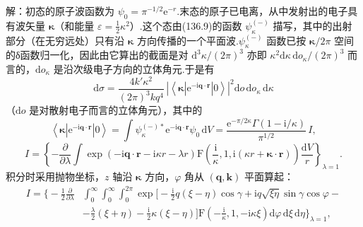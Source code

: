 解：初态的原子波函数为 $\psi_0=\pi^{-1/2}\mathrm{e}^{-r}$.末态的原子已电离，从中发射出的电子具有波矢量 $\boldsymbol{\kappa}$（和能量 $\varepsilon=\frac{1}{2}\kappa^2$）.这个态由(136.9)的函数 $\psi_{\kappa}^{(-)}$ 描写，其中的出射部分（在无穷远处）只有沿 $\boldsymbol{\kappa}$ 方向传播的一个平面波.$\psi_{\kappa}^{(-)}$ 函数已按 $\boldsymbol{\kappa}/2\pi$ 空间的δ函数归一化，因此由它算出的截面是对 $\mathrm{d}^3\kappa/(2\pi)^3$ 亦即 $\kappa^2\mathrm{d}\kappa\,\mathrm{d}o_{\kappa}/(2\pi)^3$ 而言的，$\mathrm{d}o_{\kappa}$ 是沿次级电子方向的立体角元.于是有
\begin{equation*}
  \mathrm{d}\sigma=\frac{4k'\kappa^2}{(2\pi)^3kq^4}\,
  \left|\left\langle\boldsymbol{\kappa}\left|\mathrm{e}^{-\mathrm{i}\boldsymbol{q}\cdot\boldsymbol{r}}\right|0\right\rangle\right|^2
  \mathrm{d}o\,\mathrm{d}o_{\kappa}\,\mathrm{d}\kappa
\end{equation*}
（$\mathrm{d}o$ 是对散射电子而言的立体角元），其中的
\begin{equation*}
  \left\langle\boldsymbol{\kappa}\left|\mathrm{e}^{-\mathrm{i}\boldsymbol{q}\cdot\boldsymbol{r}}\right|0\right\rangle
  =\int\psi_{\kappa}^{(-)*}\mathrm{e}^{-\mathrm{i}\boldsymbol{q}\cdot\boldsymbol{r}}\psi_0\,\mathrm{d}V
  =\frac{\mathrm{e}^{-\pi/2\kappa}\Gamma(1-\mathrm{i}/\kappa)}{\pi^{1/2}}\,I,
\end{equation*}
\begin{equation*}
  I=\left\{-\frac{\partial}{\partial\lambda}\int
  \exp\left(-\mathrm{i}\boldsymbol{q}\cdot\boldsymbol{r}-\mathrm{i}\kappa r-\lambda r\right)
  \mathrm{F}\left(\frac{\mathrm{i}}{\kappa},1,\mathrm{i}(\kappa r+\boldsymbol{\kappa}\cdot\boldsymbol{r})\right)
  \frac{\mathrm{d}V}{r}\right\}_{\lambda=1}.
\end{equation*}
积分时采用抛物坐标，$z$ 轴沿 $\boldsymbol{\kappa}$ 方向，$\varphi$ 角从 $(\boldsymbol{q},\boldsymbol{k})$ 平面算起：
\begin{equation*}
\begin{aligned}
  I=\bigg\{-\frac{1}{2}\frac{\partial}{\partial\lambda}
  &\int_0^{\infty}\!\!\int_0^{\infty}\!\!\int_0^{2\pi}
  \exp\bigg[-\frac{\mathrm{i}}{2}q(\xi-\eta)\cos\gamma
  +\mathrm{i}q\sqrt{\xi\eta}\sin\gamma\cos\varphi-\\
  &-\frac{\lambda}{2}(\xi+\eta)-\frac{\mathrm{i}}{2}\kappa(\xi-\eta)\bigg]
  \mathrm{F}\left(-\frac{\mathrm{i}}{\kappa},1,-\mathrm{i}\kappa\xi\right)
  \mathrm{d}\varphi\,\mathrm{d}\xi\,\mathrm{d}\eta\bigg\}_{\lambda=1},
\end{aligned}
\end{equation*}
